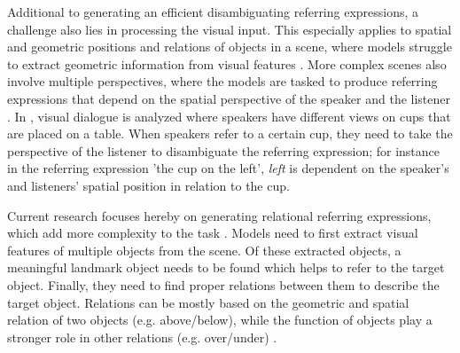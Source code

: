 Additional to generating an efficient disambiguating referring expressions, a challenge also lies in processing the visual input.
This especially applies to spatial and geometric positions and relations of objects in a scene, where models struggle to extract geometric information from visual features \citep{Kelleher2017}.
More complex scenes also involve multiple perspectives, where the models are tasked to produce referring expressions that depend on the spatial perspective of the speaker and the listener \citep{Ahrens2022,Lee2022}.
In \citep{Dobnik2021}, visual dialogue is analyzed where speakers have different views on cups that are placed on a table.
When speakers refer to a certain cup, they need to take the perspective of the listener to disambiguate the referring expression; for instance in the referring expression 'the cup on the left', \emph{left} is dependent on the speaker's and listeners' spatial position in relation to the cup.

Current research focuses hereby on generating relational referring expressions, which add more complexity to the task \citep{Ghanimifard2017,Ghanimifard2019,Ramisa2015,Liu2023}.
Models need to first extract visual features of multiple objects from the scene.
Of these extracted objects, a meaningful landmark object needs to be found which helps to refer to the target object.
Finally, they need to find proper relations between them to describe the target object.
Relations can be mostly based on the geometric and spatial relation of two objects (e.g. above/below), while the function of objects play a stronger role in other relations (e.g. over/under) \citep{Coventry2005,Dobnik2013}.


